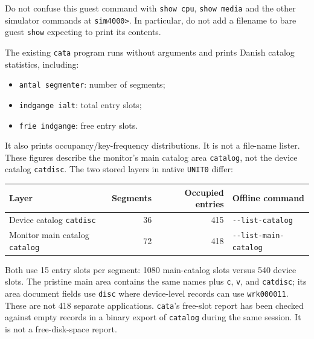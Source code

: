 Do not confuse this guest command with \passthrough{\lstinline!show cpu!}, \passthrough{\lstinline!show media!} and the other simulator commands at \passthrough{\lstinline!sim4000>!}. In particular, do not add a filename to bare guest \passthrough{\lstinline!show!} expecting to print its contents.

The existing \passthrough{\lstinline!cata!} program runs without arguments and prints Danish catalog statistics, including:

\begin{itemize}
\tightlist
\item
  \passthrough{\lstinline!antal segmenter!}: number of segments;
\item
  \passthrough{\lstinline!indgange ialt!}: total entry slots;
\item
  \passthrough{\lstinline!frie indgange!}: free entry slots.
\end{itemize}

It also prints occupancy/key-frequency distributions. It is not a file-name lister. These figures describe the monitor's main catalog area \passthrough{\lstinline!catalog!}, not the device catalog \passthrough{\lstinline!catdisc!}. The two stored layers in native \passthrough{\lstinline!UNIT0!} differ:

\begin{longtable}[]{@{}lrrl@{}}
\toprule\noalign{}
Layer & Segments & Occupied entries & Offline command \\
\midrule\noalign{}
\endhead
\bottomrule\noalign{}
\endlastfoot
Device catalog \passthrough{\lstinline!catdisc!} & 36 & 415 & \passthrough{\lstinline!--list-catalog!} \\
Monitor main catalog \passthrough{\lstinline!catalog!} & 72 & 418 & \passthrough{\lstinline!--list-main-catalog!} \\
\end{longtable}

Both use 15 entry slots per segment: 1080 main-catalog slots versus 540 device slots. The pristine main area contains the same names plus \passthrough{\lstinline!c!}, \passthrough{\lstinline!v!}, and \passthrough{\lstinline!catdisc!}; its area document fields use \passthrough{\lstinline!disc!} where device-level records can use \passthrough{\lstinline!wrk000011!}. These are not 418 separate applications. \passthrough{\lstinline!cata!}'s free-slot report has been checked against empty records in a binary export of \passthrough{\lstinline!catalog!} during the same session. It is not a free-disk-space report.

